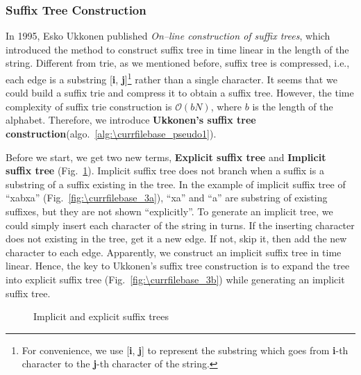 \documentclass[catalog.tex]{subfiles}
\begin{document}
	\subsubsection*{Suffix Tree Construction\cite{UkkonenAlgo}}\label{alg:\currfilebase}
		In 1995, Esko Ukkonen published {\it On–line construction of suffix trees}\cite{Ukkonen}, which introduced the method to construct suffix tree in time linear in the length of the string. Different from trie, as we mentioned before, suffix tree is compressed, i.e., each edge is a substring [{\bf i}, {\bf j}]\footnote{For convenience, we use [{\bf i}, {\bf j}] to represent the substring which goes from {\bf i}-th character to the {\bf j}-th character of the string.} rather than a single character. It seems that we could build a suffix trie and compress it to obtain a suffix tree. However, the time complexity of suffix trie construction is $\mathcal{O}(bN)$, where $b$ is the length of the alphabet. Therefore, we introduce {\bf Ukkonen’s suffix tree construction}(algo.~\ref{alg:\currfilebase_pseudo1}). \par
		Before we start, we get two new terms, {\bf Explicit suffix tree} and {\bf Implicit suffix tree} (Fig.~\ref{fig:\currfilebase_group3}). Implicit suffix tree does not branch when a suffix is a substring of a suffix existing in the tree. In the example of implicit suffix tree of ``xabxa'' (Fig.~\ref{fig:\currfilebase_3a}), ``xa'' and ``a'' are substring of existing suffixes, but they are not shown ``explicitly''. To generate an implicit tree, we could simply insert each character of the string in turns. If the inserting character does not existing in the tree, get it a new edge. If not, skip it, then add the new character to each edge. Apparently, we construct an implicit suffix tree in time linear. Hence, the key to Ukkonen's suffix tree construction is to expand the tree into explicit suffix tree (Fig.~\ref{fig:\currfilebase_3b}) while generating an implicit suffix tree.


		\begin{figure}[!htb]
			\centering
			\hspace{2cm} %
			\caption{Implicit and explicit suffix trees}
			\label{fig:\currfilebase_group3}
		\end{figure}
\end{document}
